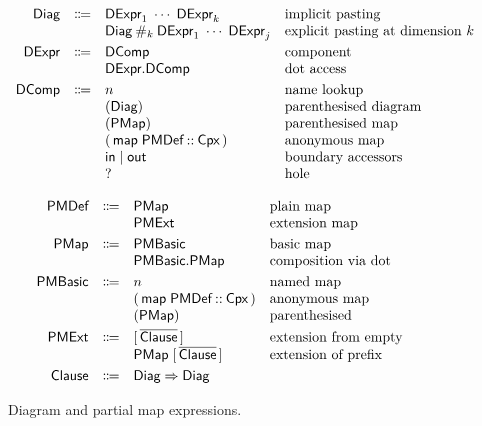 \documentclass[acmsmall,screen,nonacm]{acmart}
\begin{document}
\begin{figure}[t]
\[
  \begin{array}{rcll}
    \textsf{Diag} & \Coloneqq & \textsf{DExpr}_1 \;\cdots\; \textsf{DExpr}_k
               & \text{implicit pasting} \\
             &           & \textsf{Diag} \mathbin{\#_{k}} \textsf{DExpr}_1 \;\cdots\; \textsf{DExpr}_j
               & \text{explicit pasting at dimension $k$} \\[3pt]
    \textsf{DExpr}   & \Coloneqq & \textsf{DComp}
               & \text{component} \\
             &           & \textsf{DExpr}.\textsf{DComp}
               & \text{dot access} \\[3pt]
    \textsf{DComp}   & \Coloneqq & n
               & \text{name lookup} \\
             &           & (\textsf{Diag})
               & \text{parenthesised diagram} \\
             &           & (\textsf{PMap})
               & \text{parenthesised map} \\
             &           & (\,\mathsf{map}\;\textsf{PMDef} \mathbin{::} \textsf{Cpx}\,)
               & \text{anonymous map} \\
             &           & \mathsf{in} \mid \mathsf{out}
               & \text{boundary accessors} \\
             &           & \mathsf{?}
               & \text{hole}
  \end{array}
\]

\[
  \begin{array}{rcll}
    \textsf{PMDef}  & \Coloneqq & \textsf{PMap}
                & \text{plain map} \\
              &           & \textsf{PMExt}
                & \text{extension map} \\[3pt]
    \textsf{PMap}    & \Coloneqq & \textsf{PMBasic}
                & \text{basic map} \\
              &           & \textsf{PMBasic}.\textsf{PMap}
                & \text{composition via dot} \\[3pt]
    \textsf{PMBasic} & \Coloneqq & n
                & \text{named map} \\
              &           & (\,\mathsf{map}\;\textsf{PMDef} \mathbin{::} \textsf{Cpx}\,)
                & \text{anonymous map} \\
              &           & (\textsf{PMap})
                & \text{parenthesised} \\[3pt]
    \textsf{PMExt}  & \Coloneqq & [\,\overline{\textsf{Clause}}\,]
                & \text{extension from empty} \\
              &           & \textsf{PMap}\;[\,\overline{\textsf{Clause}}\,]
                & \text{extension of prefix} \\[3pt]
    \textsf{Clause}   & \Coloneqq & \textsf{Diag} \Rightarrow \textsf{Diag}
  \end{array}
\]
\caption{Diagram and partial map expressions.}
\label{fig:syntax:expr}
\end{figure}
\end{document}
